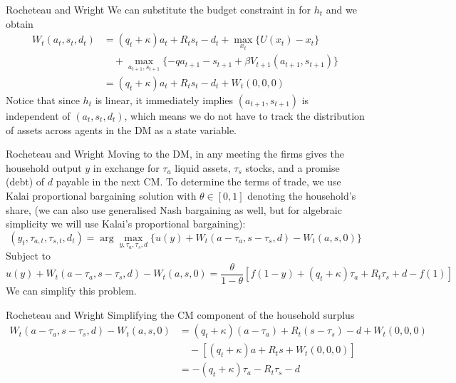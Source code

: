 \documentclass[aspectratio=169,xcolor=dvipsnames]{beamer}
\begin{document}
\begin{frame}{Rocheteau and Wright}
    We can substitute the budget constraint in for $h_t$ and we obtain
    \begin{align*}
        W_t(a_t, s_t, d_t) &= (q_t + \kappa) a_t + R_t s_t - d_t + \max_{x_t} \{U(x_t) - x_t\} \\
        &\quad + \max_{a_{t+1}, s_{t+1}} \{-q a_{t+1} - s_{t+1} + \beta V_{t+1}(a_{t+1}, s_{t+1})\} \\
        &= (q_t + \kappa) a_t + R_t s_t - d_t + W_t(0, 0, 0)
    \end{align*}
    Notice that since $h_t$ is linear, it immediately implies $(a_{t+1}, s_{t+1})$ is independent of $(a_t, s_t, d_t)$, which means we do not have to track the distribution of assets across agents in the DM as a state variable.
\end{frame}

\begin{frame}{Rocheteau and Wright}
    Moving to the DM, in any meeting the firms gives the household output $y$ in exchange for $\tau_a$ liquid assets, $\tau_s$ stocks, and a promise (debt) of $d$ payable in the next CM. To determine the terms of trade, we use Kalai proportional bargaining solution with $\theta \in [0, 1]$ denoting the household's share, (we can also use generalised Nash bargaining as well, but for algebraic simplicity we will use Kalai's proportional bargaining):
    \[
        (y_t, \tau_{a,t}, \tau_{s,t}, d_t) = \arg \max_{y, \tau_a, \tau_s, d} \{u(y) + W_t(a - \tau_a, s - \tau_s, d) - W_t(a, s, 0)\}
    \]
    Subject to
    \[
        u(y) + W_t(a - \tau_a, s - \tau_s, d) - W_t(a, s, 0) = \frac{\theta}{1-\theta}[f(1 - y) + (q_t + \kappa)\tau_a + R_t \tau_s + d - f(1)]
    \]
    We can simplify this problem.
\end{frame}

\begin{frame}{Rocheteau and Wright}
    Simplifying the CM component of the household surplus
    \begin{align*}
        W_t(a - \tau_a, s - \tau_s, d) - W_t(a, s, 0) &= (q_t + \kappa)(a - \tau_a) + R_t(s - \tau_s) - d + W_t(0,0,0) \\
        &\quad - [(q_t + \kappa) a + R_t s + W_t(0,0,0)] \\
        &= -(q_t + \kappa) \tau_a - R_t \tau_s - d
    \end{align*}
\end{frame}
\end{document}
